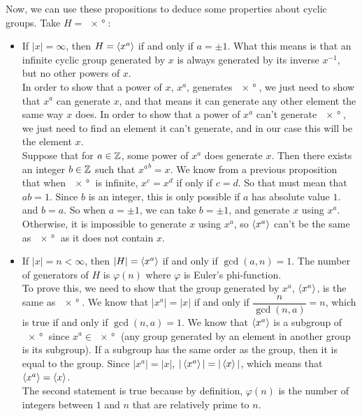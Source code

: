 \documentclass[12pt]{article}
\begin{document}
    Now, we can use these propositions to deduce some properties
    about cyclic groups.
    Take $H = \ang{x}$:
    \begin{itemize}[label=$\diamond$]
        \item 
            If $|x| = \infty$,
            then $H = \left\langle x^a \right\rangle$ if and only if $a = \pm 1$.
            What this means is that an infinite cyclic group
            generated by $x$
            is always generated by its inverse $x^{-1}$,
            but no other powers of $x$. \\
            In order to show that a power of $x$, $x^a$,
            generates $\ang{x}$,
            we just need to show that $x^a$ can generate $x$,
            and that means it can generate any other element
            the same way $x$ does.
            In order to show that a power of $x^a$
            can't generate $\ang{x}$,
            we just need to find an element it can't generate,
            and in our case this will be the element $x$. \\
            Suppose that for $a \in \mathbb{Z}$,
            some power of $x^a$ does generate $x$.
            Then there exists an integer $b \in \mathbb{Z}$
            such that ${x^a}^b = x$.
            We know from a previous proposition that when $\ang{x}$
            is infinite, $x^{c} = x^d$ if only if $c = d$.
            So that must mean that $ab = 1$.
            Since $b$ is an integer,
            this is only possible if $a$ has absolute value $1$.
            and $b = a$.
            So when $a = \pm 1$, we can take $b = \pm 1$,
            and generate $x$ using $x^a$.
            Otherwise, it is impossible to generate $x$ using $x^a$,
            so $\left\langle x^a \right\rangle$ can't be the same as $\ang{x}$
            as it does not contain $x$.
        \item
            If $|x| = n < \infty$, then $|H| = \left\langle x^a \right\rangle$
            if and only if $\gcd(a, n) = 1$.
            The number of generators of $H$ is $\varphi(n)$
            where $\varphi$ is Euler's phi-function. \\
            To prove this, we need to show that the group
            generated by $x^a$, $\left\langle x^a \right\rangle$,
            is the same as $\ang{x}$.
            We know that $|x^a| = |x|$
            if and only if $\dfrac{n}{\gcd(n, a)} = n$,
            which is true if and only if $\gcd(n, a) = 1$.
            We know that $\left\langle x^a \right\rangle$ is a subgroup of $\ang{x}$
            since $x^a \in \ang{x}$
            (any group generated by an element in another group
            is its subgroup).
            If a subgroup has the same order as the group,
            then it is equal to the group.
            Since $|x^a| = |x|$, $|\left\langle x^a \right\rangle| = |\left\langle x \right\rangle|$,
            which means that $\left\langle x^a \right\rangle = \left\langle x \right\rangle$. \\
            The second statement is true because by definition,
            $\varphi(n)$ is the number of integers
            between $1$ and $n$ that are relatively prime to $n$.
    \end{itemize}
\end{document}

